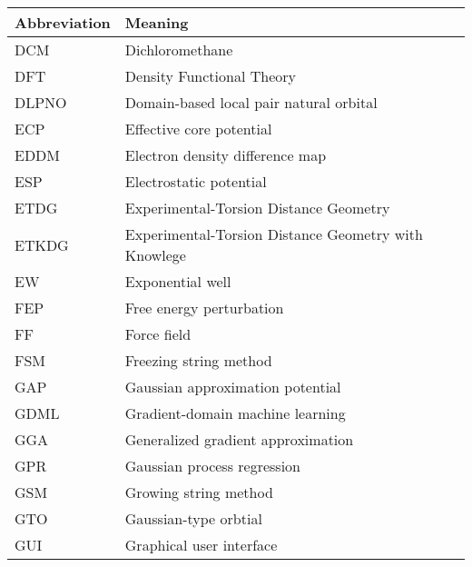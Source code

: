\documentclass[../main.tex]{subfiles}
\begin{document}
\begin{table}[h!]
\def\arraystretch{2.0}
\begin{tabularx}{\textwidth}{YY}
Abbreviation & Meaning \\
\hline
DCM	&	Dichloromethane	\\
DFT	&	Density Functional Theory	\\
DLPNO	&	Domain-based local pair natural orbital	\\
ECP	&	Effective core potential	\\
EDDM	&	Electron density difference map	\\
ESP	&	Electrostatic potential	\\
ETDG	&	Experimental-Torsion Distance Geometry	\\
ETKDG	&	Experimental-Torsion Distance Geometry with Knowlege	\\
EW	&	Exponential well	\\
FEP	&	Free energy perturbation	\\
FF	&	Force field	\\
FSM	&	Freezing string method	\\
GAP	&	Gaussian approximation potential	\\
GDML	&	Gradient-domain machine learning	\\
GGA	&	Generalized gradient approximation	\\
GPR	&	Gaussian process regression	\\
GSM	&	Growing string method	\\
GTO	&	Gaussian-type orbtial	\\
GUI	&	Graphical user interface	\\
\end{tabularx}
\end{table}
\newpage
\end{document}
